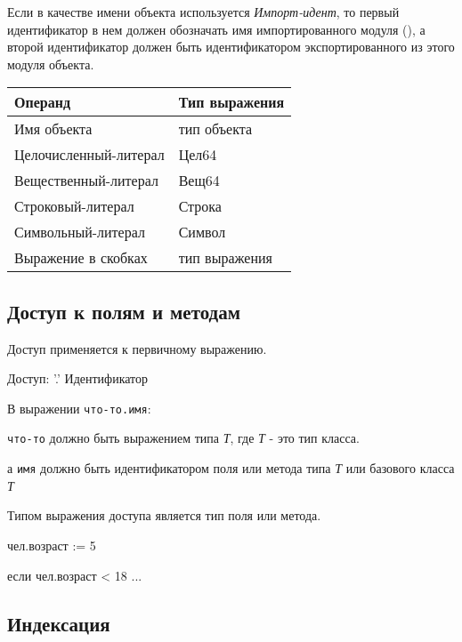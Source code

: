 Если в качестве имени объекта используется \emph{Импорт-идент}, то первый идентификатор в нем должен обозначать имя импортированного модуля (), а второй идентификатор должен быть идентификатором экспортированного из этого модуля объекта.

\smallskip
\begin{tabular}[c]{l|l}
\textbf{Операнд} & \textbf{Тип выражения} \\ \hline
Имя объекта & тип объекта \\
Целочисленный-литерал & Цел64 \\
Вещественный-литерал & Вещ64 \\ 
Строковый-литерал & Строка \\ 
Символьный-литерал & Символ \\
Выражение в скобках & тип выражения \\
\end{tabular}

\hypertarget{selector}{%
\subsection{Доступ к полям и методам}\label{expr:selector}}

Доступ применяется к первичному выражению.

\begin{Grammar}
Доступ: '.' Идентификатор
\end{Grammar}    

В выражении \verb|что-то.имя|:
\begin{d_itemize}
\item
    \verb|что-то| должно быть выражением типа \emph{Т}, где \emph{Т} - это тип класса. 
\item
    а \verb|имя| должно быть идентификатором поля или метода типа \emph{Т} или базового класса \emph{Т}
\end{d_itemize}

Типом выражения доступа является тип поля или метода.

\begin{Trivil}
чел.возраст := 5

если чел.возраст < 18 { ... }
\end{Trivil}

\hypertarget{indexation}{%
\subsection{Индексация}\label{expr:indexation}}

